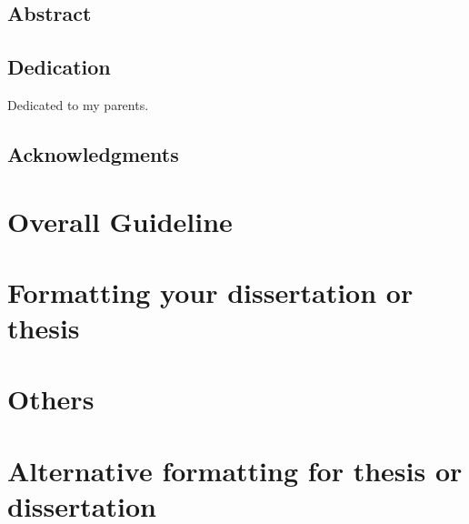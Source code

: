 \documentclass[letterpaper,12pt]{report}
\begin{document}
\setcounter{page}{1}



\newpage
\onehalfspace
\section*{Abstract}


\doublespacing

\newpage
\begin{center}
\section*{Dedication}
Dedicated to my parents.
\end{center}

\newpage
\section*{Acknowledgments}


\newpage
\renewcommand*\contentsname{Table of Contents}
\tableofcontents

\newpage
\listoftables

\newpage
\listoffigures

\newpage

\setcounter{page}{1}
\linespread{2}

\chapter{ Overall Guideline }\label{chap:intro}


\chapter{ Formatting your dissertation or thesis }\label{chap:related_work}


\chapter{ Others }\label{chap:prob_def}


\chapter{Alternative formatting for thesis or dissertation}\label{chap:gbplanner}



\renewcommand{\bibname}{ References }

\end{document}
